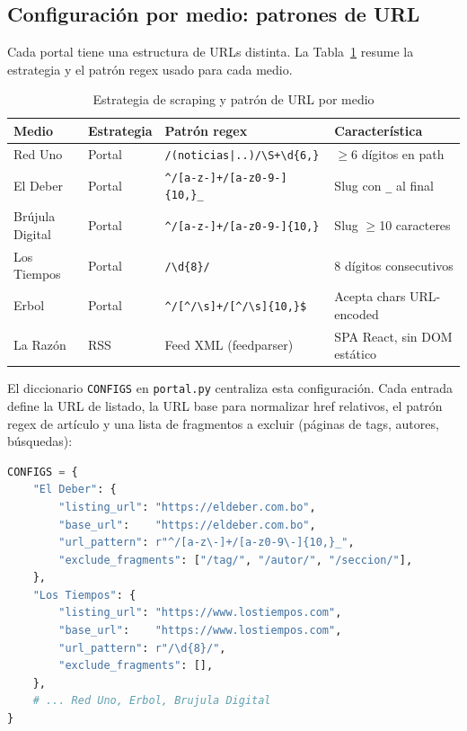 \documentclass[12pt,a4paper]{article}
\begin{document}
\subsection{Configuración por medio: patrones de URL}

Cada portal tiene una estructura de URLs distinta. La Tabla~\ref{tab:scraping_medios} resume la estrategia y el patrón regex usado para cada medio.

\begin{table}[H]
\centering
\caption{Estrategia de scraping y patrón de URL por medio}
\label{tab:scraping_medios}
\begin{tabular}{@{}p{3cm}p{2cm}p{5.5cm}p{2.5cm}@{}}
\toprule
\rowcolor{azulAS!15}
\textbf{Medio} & \textbf{Estrategia} & \textbf{Patrón regex} & \textbf{Característica} \\
\midrule
Red Uno & Portal & \texttt{/(noticias|..)/\textbackslash S+\textbackslash d\{6,\}} & $\geq$6 dígitos en path \\
\rowcolor{grisCelda}
El Deber & Portal & \texttt{\^{}/[a-z-]+/[a-z0-9-]\{10,\}\_} & Slug con \texttt{\_} al final \\
Brújula Digital & Portal & \texttt{\^{}/[a-z-]+/[a-z0-9-]\{10,\}} & Slug $\geq$10 caracteres \\
\rowcolor{grisCelda}
Los Tiempos & Portal & \texttt{/\textbackslash d\{8\}/} & 8 dígitos consecutivos \\
Erbol & Portal & \texttt{\^{}/[\^{}/\textbackslash s]+/[\^{}/\textbackslash s]\{10,\}\$} & Acepta chars URL-encoded \\
\rowcolor{grisCelda}
La Razón & RSS & Feed XML (feedparser) & SPA React, sin DOM estático \\
\bottomrule
\end{tabular}
\end{table}

El diccionario \texttt{CONFIGS} en \texttt{portal.py} centraliza esta configuración. Cada entrada define la URL de listado, la URL base para normalizar href relativos, el patrón regex de artículo y una lista de fragmentos a excluir (páginas de tags, autores, búsquedas):

\begin{lstlisting}[language=Python, caption=Configuración de scraping por medio (portal.py)]
CONFIGS = {
    "El Deber": {
        "listing_url": "https://eldeber.com.bo",
        "base_url":    "https://eldeber.com.bo",
        "url_pattern": r"^/[a-z\-]+/[a-z0-9\-]{10,}_",
        "exclude_fragments": ["/tag/", "/autor/", "/seccion/"],
    },
    "Los Tiempos": {
        "listing_url": "https://www.lostiempos.com",
        "base_url":    "https://www.lostiempos.com",
        "url_pattern": r"/\d{8}/",
        "exclude_fragments": [],
    },
    # ... Red Uno, Erbol, Brujula Digital
}
\end{lstlisting}
\end{document}
